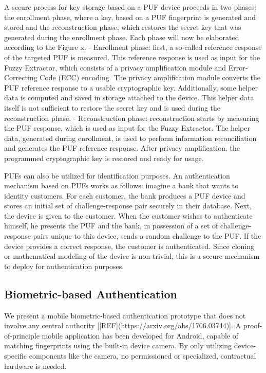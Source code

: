 \documentclass[USenglish]{article}
\begin{document}
A secure process for key storage based on a PUF device proceeds in two phases: the enrollment phase, where a key, based on a PUF fingerprint is generated and stored and the reconstruction phase, which restores the secret key that was generated during the enrollment phase.
Each phase will now be elaborated according to the Figure x.
- Enrollment phase: first, a so-called reference response of the targeted PUF is measured. This reference response is used as input for the Fuzzy Extractor, which consists of a privacy amplification module and Error-Correcting Code (ECC) encoding. The privacy amplification module converts the PUF reference response to a usable cryptographic key. Additionally, some helper data is computed and saved in storage attached to the device. This helper data itself is not sufficient to restore the secret key and is used during the reconstruction phase.
- Reconstruction phase: reconstruction starts by measuring the PUF response, which is used as input for the Fuzzy Extractor. The helper data, generated during enrollment, is used to perform information reconciliation and generates the PUF reference response. After privacy amplification, the programmed cryptographic key is restored and ready for usage.

PUFs can also be utilized for identification purposes.
An authentication mechanism based on PUFs works as follows: imagine a bank that wants to identity customers.
For each customer, the bank produces a PUF device and stores an initial set of challenge-response pair securely in their database.
Next, the device is given to the customer.
When the customer wishes to authenticate himself, he presents the PUF and the bank, in possession of a set of challenge-response pairs unique to this device, sends a random challenge to the PUF.
If the device provides a correct response, the customer is authenticated.
Since cloning or mathematical modeling of the device is non-trivial, this is a secure mechanism to deploy for authentication purposes.

\subsection{Biometric-based Authentication}

We present a mobile biometric-based authentication prototype that does not involve any central authority [[REF](https://arxiv.org/abs/1706.03744)].
A proof-of-principle mobile application has been developed for Android, capable of matching fingerprints using the built-in device camera.
By only utilizing device-specific components like the camera, no permissioned or specialized, contractual hardware is needed.
\end{document}
